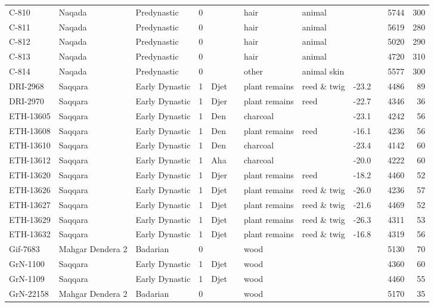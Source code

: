 \documentclass[a4paper,8pt]{article}
\begin{document}
\begin{landscape}
\begin{center}
\begin{longtable}{|l|>{\raggedright}p{20ex}|l|r|l|>{\raggedright}p{25ex}|l|l|r|l|r|r|}
C-810 & Naqada & Predynastic & 0 &  &  & hair & animal &   &  & 5744 & 300\\
C-811 & Naqada & Predynastic & 0 &  &  & hair & animal &   &  & 5619 & 280\\
C-812 & Naqada & Predynastic & 0 &  &  & hair & animal &   &  & 5020 & 290\\
C-813 & Naqada & Predynastic & 0 &  &  & hair & animal &   &  & 4720 & 310\\
C-814 & Naqada & Predynastic & 0 &  &  & other & animal skin &   &  & 5577 & 300\\
DRI-2968 & Saqqara & Early Dynastic & 1 & Djet &  & plant remains & reed \& twig & -23.2 &  & 4486 & 89\\
DRI-2970 & Saqqara & Early Dynastic & 1 & Djer &  & plant remains & reed & -22.7 &  & 4346 & 36\\
ETH-13605 & Saqqara & Early Dynastic & 1 & Den &  & charcoal &  & -23.1 &  & 4242 & 56\\
ETH-13608 & Saqqara & Early Dynastic & 1 & Den &  & plant remains & reed & -16.1 &  & 4236 & 56\\
ETH-13610 & Saqqara & Early Dynastic & 1 & Den &  & charcoal &  & -23.4 &  & 4142 & 60\\
ETH-13612 & Saqqara & Early Dynastic & 1 & Aha &  & charcoal &  & -20.0 &  & 4222 & 60\\
ETH-13620 & Saqqara & Early Dynastic & 1 & Djer &  & plant remains & reed & -18.2 &  & 4460 & 52\\
ETH-13626 & Saqqara & Early Dynastic & 1 & Djet &  & plant remains & reed \& twig & -26.0 &  & 4236 & 57\\
ETH-13627 & Saqqara & Early Dynastic & 1 & Djet &  & plant remains & reed \& twig & -21.6 &  & 4469 & 52\\
ETH-13629 & Saqqara & Early Dynastic & 1 & Djet &  & plant remains & reed \& twig & -26.3 &  & 4311 & 53\\
ETH-13632 & Saqqara & Early Dynastic & 1 & Djet &  & plant remains & reed \& twig & -16.8 &  & 4319 & 56\\
Gif-7683 & Mahgar Dendera 2 & Badarian & 0 &  &  & wood &  &   &  & 5130 & 70\\
GrN-1100 & Saqqara & Early Dynastic & 1 & Djet &  & wood &  &   &  & 4360 & 60\\
GrN-1109 & Saqqara & Early Dynastic & 1 & Djet &  & wood &  &   &  & 4460 & 55\\
GrN-22158 & Mahgar Dendera 2 & Badarian & 0 &  &  & wood &  &   &  & 5170 & 35\\

\end{longtable}
\end{center}
\end{landscape}
\end{document}
